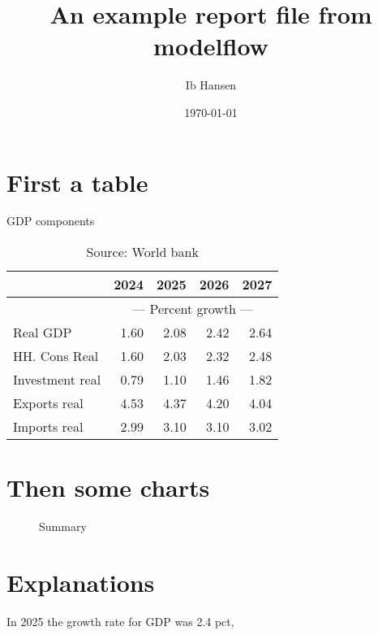 \documentclass{article}
\begin{document}
\title{An example report file from modelflow }
\author{Ib Hansen}
\date{\today} 

\maketitle
\tableofcontents
\newpage
\section{First a table}

\begin{table}[ht]
\caption{GDP components}
\begin{tabular}{lrrrr}
\toprule
 & 2024 & 2025 & 2026 & 2027 \\
\midrule
&\multicolumn{4}{c}{{---  Percent growth ---}}                     \\
Real GDP & 1.60 & 2.08 & 2.42 & 2.64 \\
HH. Cons Real & 1.60 & 2.03 & 2.32 & 2.48 \\
Investment real & 0.79 & 1.10 & 1.46 & 1.82 \\
Exports real & 4.53 & 4.37 & 4.20 & 4.04 \\
Imports real & 2.99 & 3.10 & 3.10 & 3.02 \\
\bottomrule
\end{tabular}
\caption*{Source: World bank }
\end{table}
\section{Then some charts } 
\begin{figure}[htbp]
\centering
\resizebox{\textwidth}{!}{}
\caption{Summary}
\end{figure}
\section{Explanations}
In 2025 the growth rate for GDP was 2.4 pct,
\end{document}
